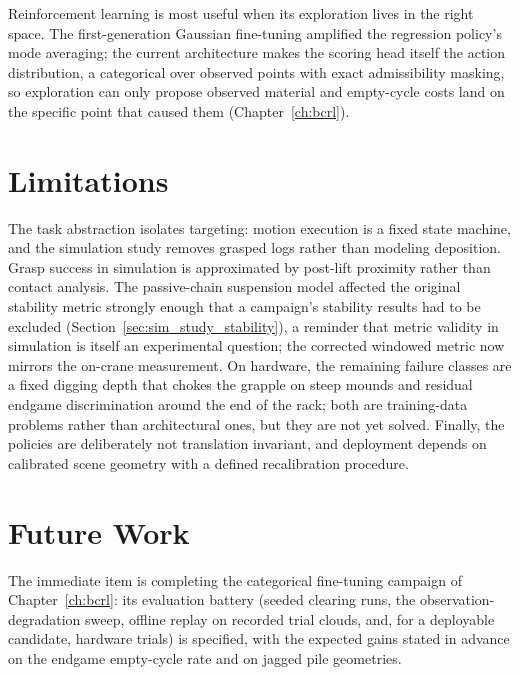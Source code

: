 Reinforcement learning is most useful when its exploration lives in the right
space. The first-generation Gaussian fine-tuning amplified the regression
policy's mode averaging; the current architecture makes the scoring head
itself the action distribution, a categorical over observed points with
exact admissibility masking, so exploration can only propose observed
material and empty-cycle costs land on the specific point that caused them
(Chapter~\ref{ch:bcrl}).

\section{Limitations}

The task abstraction isolates targeting: motion execution is a fixed state
machine, and the simulation study removes grasped logs rather than modeling
deposition. Grasp success in simulation is approximated by post-lift
proximity rather than contact analysis. The passive-chain suspension model
affected the original stability metric strongly enough that a campaign's
stability results had to be excluded (Section~\ref{sec:sim_study_stability}),
a reminder that metric validity in simulation is itself an experimental
question; the corrected windowed metric now mirrors the on-crane
measurement. On hardware, the remaining failure classes are a fixed digging
depth that chokes the grapple on steep mounds and residual endgame
discrimination around the end of the rack; both are training-data problems
rather than architectural ones, but they are not yet solved. Finally, the
policies are deliberately not translation invariant, and deployment depends
on calibrated scene geometry with a defined recalibration procedure.

\section{Future Work}

The immediate item is completing the categorical fine-tuning campaign of
Chapter~\ref{ch:bcrl}: its evaluation battery (seeded clearing runs, the
observation-degradation sweep, offline replay on recorded trial clouds, and,
for a deployable candidate, hardware trials) is specified, with the expected
gains stated in advance on the endgame empty-cycle rate and on jagged pile
geometries.

